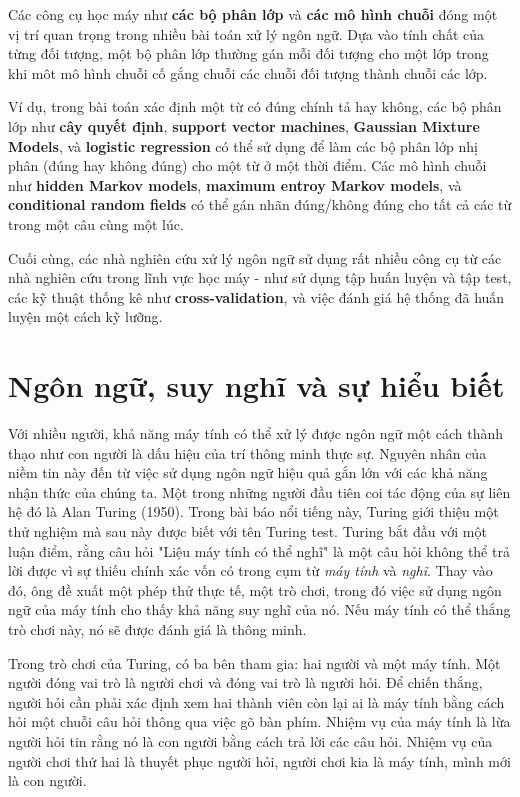 Các công cụ học máy như \textbf{các bộ phân lớp} và \textbf{các mô hình chuỗi} đóng một vị trí quan trọng trong nhiều bài toán xử lý ngôn ngữ. Dựa vào tính chất của  từng đối tượng, một bộ phân lớp thường gán mỗi đối tượng cho một lớp trong khi môt mô hình chuỗi cố gắng chuỗi các chuỗi đối tượng thành chuỗi các lớp.

Ví dụ, trong bài toán xác định một từ có đúng chính tả hay không, các bộ phân lớp như \textbf{cây quyết định}, \textbf{support vector machines}, \textbf{Gaussian Mixture Models}, và \textbf{logistic regression} có thể sử dụng để làm các bộ phân lớp nhị phân (đúng hay không đúng) cho một từ ở một thời điểm. Các mô hình chuỗi như \textbf{hidden Markov models}, \textbf{maximum entroy Markov models}, và \textbf{conditional random fields} có thể gán nhãn đúng/không đúng cho tất cả các từ trong một câu cùng một lúc.

Cuối cùng, các nhà nghiên cứu xử lý ngôn ngữ sử dụng rất nhiều công cụ từ các nhà nghiên cứu trong lĩnh vực học máy - như sử dụng tập huấn luyện và tập test, các kỹ thuật thống kê như \textbf{cross-validation}, và việc đánh giá hệ thống đã huấn luyện một cách kỹ lưỡng.

\section{Ngôn ngữ, suy nghĩ và sự hiểu biết}

Với nhiều người, khả năng máy tính có thể xử lý được ngôn ngữ một cách thành thạo như con người là dấu hiệu của trí thông minh thực sự. Nguyên nhân của niềm tin này đến từ việc sử dụng ngôn ngữ hiệu quả gắn lớn với các khả năng nhận thức của chúng ta. Một trong những người đầu tiên coi tác động của sự liên hệ đó là Alan Turing (1950). Trong bài báo nổi tiếng này, Turing giới thiệu một thử nghiệm mà sau này được biết với tên Turing test. Turing bắt đầu với một luận điểm, rằng câu hỏi "Liệu máy tính có thể nghĩ" là một câu hỏi không thể trả lời được vì sự thiếu chính xác vốn có trong cụm từ \textit{máy tính} và \textit{nghĩ}. Thay vào đó, ông đề xuất một phép thử thực tế, một trò chơi, trong đó việc sử dụng ngôn ngữ của máy tính cho thấy khả năng suy nghĩ của nó. Nếu máy tính có thể thắng trò chơi này, nó sẽ được đánh giá là thông minh.

Trong trò chơi của Turing, có ba bên tham gia: hai người và một máy tính. Một người đóng vai trò là người chơi và đóng vai trò là người hỏi. Để chiến thắng, người hỏi cần phải xác định xem hai thành viên còn lại ai là máy tính bằng cách hỏi một chuỗi câu hỏi thông qua việc gõ bàn phím. Nhiệm vụ của máy tính là lừa người hỏi tin rằng nó là con người bằng cách trả lời các câu hỏi. Nhiệm vụ của người chơi thứ hai là thuyết phục người hỏi, người chơi kia là máy tính, mình mới là con người.

